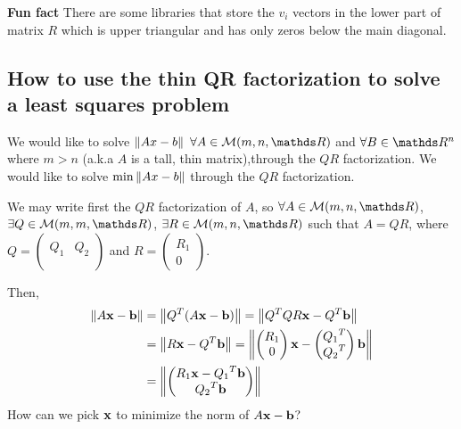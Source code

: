 \documentclass[computational_mathematics.tex]{subfiles}
\begin{document}
\begin{myframe}{\bf Fun fact}
There are some libraries that store the $v_{i}$ vectors in the lower part of matrix $R$ which is upper triangular and has only zeros below the main diagonal.
\end{myframe}

\subsection{How to use the thin QR factorization to solve a least squares problem}

We would like to solve $\left\lVert Ax-b\right\rVert$ $\forall A \in \mathcal{M}(m, n, \R)$ and $\forall B \in \R^n$ where $m > n$ (a.k.a $A$ is a tall, thin matrix),through the $QR$ factorization.
We would like to solve $\min \left\lVert Ax-b\right\rVert$ through the $QR$ factorization.

We may write first the $QR$ factorization of $A$, so $\forall A \in \mathcal{M}(m, n, \R)$, $\exists Q \in \mathcal{M}(m, m, \R)$, $\exists R \in \mathcal{M}(m, n, \R)$ such that $A = QR$, where 
$Q = \begin{pmatrix}
  &\\
  Q_1 & Q_2\\
  &\\
\end{pmatrix}$ and $R = \begin{pmatrix}
    R_1\\0
\end{pmatrix}$.

Then, 
\begin{equation}
\begin{aligned}
  \left\lVert A\mathbf{x}-\mathbf{b}\right\rVert &= \left\lVert{Q}^{T}(A\mathbf{x}-\mathbf{b})\right\rVert = \left\lVert{Q}^{T}QR\mathbf{x} - {Q}^{T}\mathbf{b}\right\rVert \\
  & = \left\lVert R\mathbf{x}-{Q}^{T}\mathbf{b}\right\rVert = \left\lVert\begin{pmatrix}
    R_1\\0
\end{pmatrix}\mathbf{x} - \begin{pmatrix}
  {Q_{1}}^{T}\\
    {Q_{2}}^{T}
\end{pmatrix}\mathbf{b}\right\rVert\\
&=\left\lVert\begin{pmatrix}
  R_{1} \mathbf{x} - {Q_{1}}^{T} \mathbf{b}\\
    {Q_{2}}^{T}\mathbf{b}
\end{pmatrix}\right\rVert
\end{aligned}
\end{equation}
How can we pick $\mathbf{x}$ to minimize the norm of $A\mathbf{x} - \mathbf{b}$?
\end{document}
